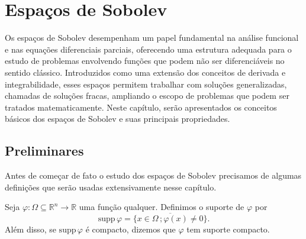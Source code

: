 \documentclass[a4paper, 11pt]{book}
\theoremstyle{definition}
\newcommand{\bN}{\mathbb{N}}
\newcommand{\bR}{\mathbb{R}}
\newcommand{\bK}{\mathbb{K}}
\newcommand{\cC}{\mathcal{C}}
\newcommand{\supp}{\mathrm{supp}\,}
\begin{document}




\chapter{Espaços de Sobolev} \label{ch:sobolev}

Os espaços de Sobolev desempenham um papel fundamental na análise funcional e nas equações diferenciais parciais, oferecendo uma estrutura adequada para o estudo de problemas envolvendo funções que podem não ser diferenciáveis no sentido clássico. Introduzidos como uma extensão dos conceitos de derivada e integrabilidade, esses espaços permitem trabalhar com soluções generalizadas, chamadas de soluções fracas, ampliando o escopo de problemas que podem ser tratados matematicamente. Neste capítulo, serão apresentados os conceitos básicos dos espaços de Sobolev e suas principais propriedades.

\section{Preliminares}

Antes de começar de fato o estudo dos espaços de Sobolev precisamos de algumas definições que serão usadas extensivamente nesse capítulo.

\begin{dbox} \label{def:suporte}
    Seja $\varphi : \Omega \subseteq \bR ^n \to \bR$ uma função qualquer. Definimos o suporte de $\varphi$ por
    \[
        \supp \varphi = \overline{\{x \in \Omega \,; \varphi(x) \neq 0\}}.
    \]
    Além disso, se $\supp\varphi$ é compacto, dizemos que $\varphi$ tem suporte compacto.
\end{dbox}
\end{document}
